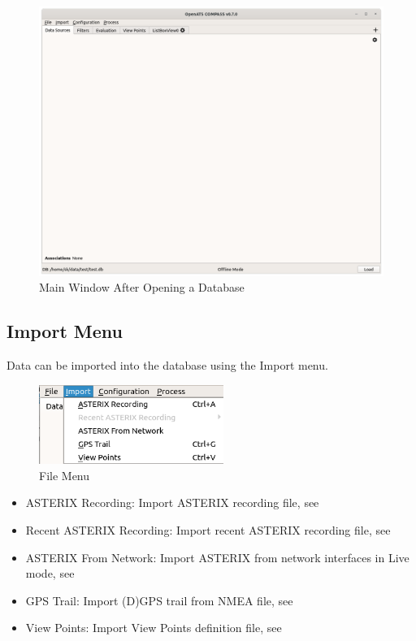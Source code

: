 \begin{figure}[H]
  \hspace*{-2.5cm}
    \includegraphics[width=19cm]{figures/main_window_opened.png}
  \caption{Main Window After Opening a Database}
\end{figure}

\subsection{Import Menu}

Data can be imported into the database using the Import menu.

\begin{figure}[H]
  \center
    \includegraphics[width=6cm,frame]{figures/ui_import_menu.png}
  \caption{File Menu}
\end{figure}

\begin{itemize}
 \item ASTERIX Recording: Import ASTERIX recording file, see 
 \item Recent ASTERIX Recording: Import recent ASTERIX recording file, see 
 \item ASTERIX From Network: Import ASTERIX from network interfaces in Live mode, see 
 \item GPS Trail: Import (D)GPS trail from NMEA file, see 
 \item View Points: Import View Points definition file, see 
\end{itemize}
\  \\

